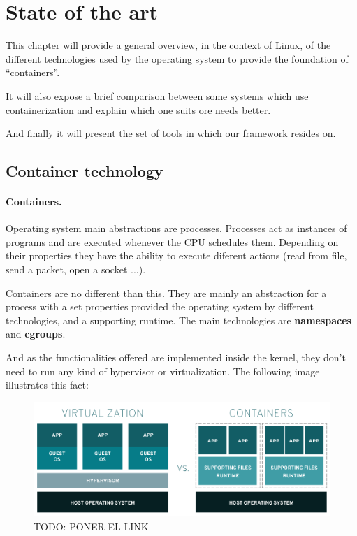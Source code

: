 \clearpage\section{State of the art}
This chapter will provide a general overview, in the context of Linux, of the different technologies used by the operating system to provide the foundation of ``containers''.

It will also expose a brief comparison between some systems which use containerization and explain which one suits ore needs better.

And finally it will present the set of tools in which our framework resides on.

\subsection{Container technology}
\paragraph{Containers.} Operating system main abstractions are processes. Processes act as instances of programs and are executed whenever the CPU schedules them. Depending on their properties they have the ability to execute diferent actions (read from file, send a packet, open a socket ...).

Containers are no different than this. They are mainly an abstraction for a process with a set properties provided the operating system by different technologies, and a supporting runtime. The main technologies are \textbf{namespaces} and \textbf{cgroups}.

And as the functionalities offered are implemented inside the kernel, they don't need to run any kind of hypervisor or virtualization. The following image illustrates this fact:

\begin{figure}[H]
	\label{fig:Virtualization vs Containers}
	\centering
	\includegraphics[width=\textwidth]{img/02/02-state-virtualization-vs-containers.png}
	\caption[Virtualization vs Containers]{\footnotesize{TODO: PONER EL LINK}}
\end{figure}


